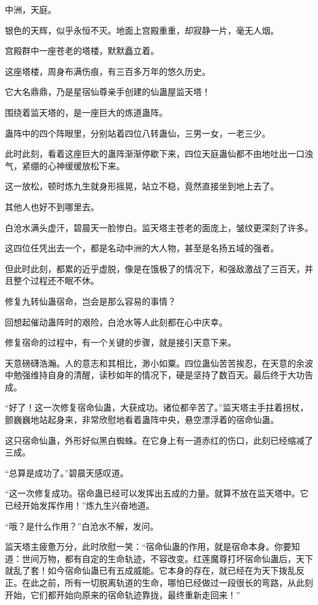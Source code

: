 
\begin{this_body}

中洲，天庭。

银色的天辉，似乎永恒不灭。地面上宫殿重重，却寂静一片，毫无人烟。

宫殿群中一座苍老的塔楼，默默矗立着。

这座塔楼，周身布满伤痕，有三百多万年的悠久历史。

它大名鼎鼎，乃是星宿仙尊亲手创建的仙蛊屋监天塔！

围绕着监天塔的，是一座巨大的炼道蛊阵。

蛊阵中的四个阵眼里，分别站着四位八转蛊仙，三男一女，一老三少。

此时此刻，看着这座巨大的蛊阵渐渐停歇下来，四位天庭蛊仙都不由地吐出一口浊气，紧绷的心神缓缓放松下来。

这一放松，顿时炼九生就身形摇晃，站立不稳，竟然直接坐到地上去了。

其他人也好不到哪里去。

白沧水满头虚汗，碧晨天一脸惨白。监天塔主苍老的面庞上，皱纹更深刻了许多。

这四位任凭出去一个，都是名动中洲的大人物，甚至是名扬五域的强者。

但此时此刻，都累的近乎虚脱，像是在饿极了的情况下，和强敌激战了三百天，并且整个过程还不眠不休。

修复九转仙蛊宿命，岂会是那么容易的事情？

回想起催动蛊阵时的艰险，白沧水等人此刻都在心中庆幸。

修复宿命的过程中，有一个关键的步骤，就是接引天意下来。

天意磅礴浩瀚。人的意志和其相比，渺小如粟。四位蛊仙苦苦挨忍，在天意的余波中勉强维持自身的清醒，读秒如年的情况下，硬是坚持了数百天。最后终于大功告成。

“好了！这一次修复宿命仙蛊，大获成功。诸位都辛苦了。”监天塔主手拄着拐杖，颤巍巍地站起身来，非常欣慰地看着蛊阵中央，悬空漂浮着的宿命仙蛊。

这只宿命仙蛊，外形好似黑白蜘蛛。在它身上有一道赤红的伤口，此刻已经缩减了三成。

“总算是成功了。”碧晨天感叹道。

“这一次修复成功。宿命蛊已经可以发挥出五成的力量。就算不放在监天塔中。它已经开始发挥作用！”炼九生兴奋地道。

“哦？是什么作用？”白沧水不解，发问。

监天塔主疲惫万分，此时欣慰一笑：“宿命仙蛊的作用，就是宿命本身。你要知道：世间万物，都有自定的生命轨迹，不容改变。红莲魔尊打坏宿命仙蛊后，天下就乱了套！如今宿命仙蛊已有五成威能。它本身的存在，就已经在为天下拨乱反正。在此之前，所有一切脱离轨道的生命，哪怕已经做过一段很长的弯路，从此刻开始，它们都开始向原来的宿命轨迹靠拢，最终重新走回来！”


\end{this_body}
